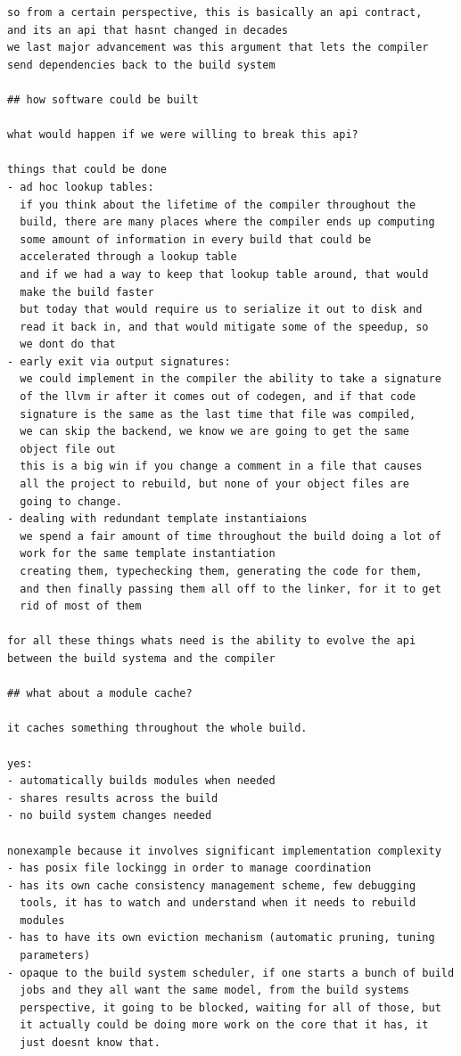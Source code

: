 \documentclass[12pt, a4paper]{report}
\begin{document}
\begin{verbatim}
so from a certain perspective, this is basically an api contract,
and its an api that hasnt changed in decades
we last major advancement was this argument that lets the compiler
send dependencies back to the build system

## how software could be built

what would happen if we were willing to break this api?

things that could be done
- ad hoc lookup tables:
  if you think about the lifetime of the compiler throughout the
  build, there are many places where the compiler ends up computing
  some amount of information in every build that could be
  accelerated through a lookup table
  and if we had a way to keep that lookup table around, that would
  make the build faster
  but today that would require us to serialize it out to disk and
  read it back in, and that would mitigate some of the speedup, so
  we dont do that
- early exit via output signatures:
  we could implement in the compiler the ability to take a signature
  of the llvm ir after it comes out of codegen, and if that code
  signature is the same as the last time that file was compiled,
  we can skip the backend, we know we are going to get the same
  object file out
  this is a big win if you change a comment in a file that causes
  all the project to rebuild, but none of your object files are
  going to change.
- dealing with redundant template instantiaions
  we spend a fair amount of time throughout the build doing a lot of
  work for the same template instantiation
  creating them, typechecking them, generating the code for them,
  and then finally passing them all off to the linker, for it to get
  rid of most of them

for all these things whats need is the ability to evolve the api
between the build systema and the compiler

## what about a module cache?

it caches something throughout the whole build.

yes:
- automatically builds modules when needed
- shares results across the build
- no build system changes needed

nonexample because it involves significant implementation complexity
- has posix file lockingg in order to manage coordination
- has its own cache consistency management scheme, few debugging
  tools, it has to watch and understand when it needs to rebuild
  modules
- has to have its own eviction mechanism (automatic pruning, tuning
  parameters)
- opaque to the build system scheduler, if one starts a bunch of build
  jobs and they all want the same model, from the build systems
  perspective, it going to be blocked, waiting for all of those, but
  it actually could be doing more work on the core that it has, it
  just doesnt know that.


\end{verbatim}
\end{document}
